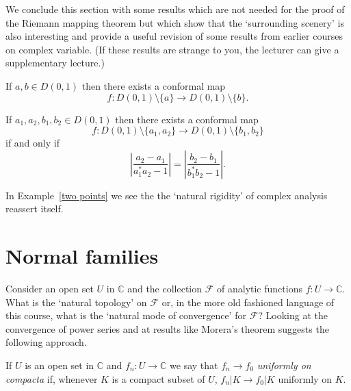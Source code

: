 We conclude this section with some results which are not
needed for the proof of the Riemann mapping theorem but
which show that the `surrounding scenery' is also
interesting and provide a useful revision of some results
from earlier courses on complex variable. (If these results
are strange to you, the lecturer can give a supplementary
lecture.)
\begin{example} If $a,b\in D(0,1)$ then there exists
a conformal map 
\[f:D(0,1)\setminus\{a\}\rightarrow D(0,1)\setminus\{b\}.\]
\end{example}
\begin{example}\label{two points} 
If $a_{1},a_{2},b_{1},b_{2}\in D(0,1)$ 
then there exists
a conformal map 
\[f:D(0,1)\setminus\{a_{1},a_{2}\}\rightarrow 
D(0,1)\setminus\{b_{1},b_{2}\}\]
if and only if
\[\left|\frac{a_{2}-a_{1}}{a_{1}^{*}a_{2}-1}\right|
=\left|\frac{b_{2}-b_{1}}{b_{1}^{*}b_{2}-1}\right|.\]
\end{example}
In Example~\ref{two points} we see the the `natural rigidity'
of complex analysis reassert itself.
\section{Normal families} Consider an open set $U$ 
in ${\mathbb C}$ and the collection ${\mathcal F}$
of analytic functions $f:U\rightarrow{\mathbb C}$.
What is the `natural topology' on ${\mathcal F}$
or, in the more old fashioned language of this course,
what is the `natural mode of convergence' for ${\mathcal F}$?
Looking at the convergence of power series and
at results like Morera's theorem suggests the following
approach.   
\begin{definition} If $U$ is an open set
in ${\mathbb C}$ and $f_{n}:U\rightarrow {\mathbb C}$
we say that $f_{n}\rightarrow f_{0}$ 
\emph{uniformly on compacta} if, whenever $K$ is
a compact subset of $U$, $f_{n}|K\rightarrow f_{0}|K$ 
uniformly on $K$.
\end{definition}

